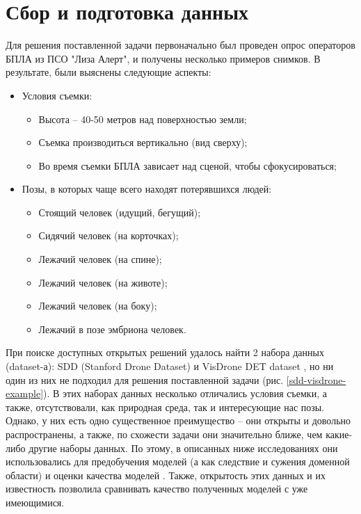 \section{Сбор и подготовка данных}\label{sect-3}

Для решения поставленной задачи первоначально был проведен опрос операторов БПЛА из ПСО "Лиза Алерт", и получены несколько примеров снимков. В результате, были выяснены следующие аспекты:

\begin{itemize}
    \item Условия съемки:
    \begin{itemize}
        \item Высота -- 40-50 метров над поверхностью земли;
        \item Съемка производиться вертикально (вид сверху);
        \item Во время съемки БПЛА зависает над сценой, чтобы сфокусироваться;
    \end{itemize}
    \item Позы, в которых чаще всего находят потерявшихся людей:
    \begin{itemize}
        \item Стоящий человек (идущий, бегущий);
        \item Сидячий человек (на корточках);
        \item Лежачий человек (на спине);
        \item Лежачий человек (на животе);
        \item Лежачий человек (на боку);
        \item Лежачий в позе эмбриона человек.
    \end{itemize}
\end{itemize}

При поиске доступных открытых решений удалось найти 2 набора данных (dataset-а): SDD (Stanford Drone Dataset) \cite{lib-sdd} и VisDrone DET dataset \cite{lib-visdrone}, но ни один из них не подходил для решения поставленной задачи (рис. \ref{sdd-visdrone-example}). В этих наборах данных несколько отличались условия съемки, а также, отсутствовали, как природная среда, так и интересующие нас позы. Однако, у них есть одно существенное преимущество -- они открыты и довольно распространены, а также, по схожести задачи они значительно ближе, чем какие-либо другие наборы данных. По этому, в описанных ниже исследованиях они использовались для предобучения моделей (а как следствие и сужения доменной области) и оценки качества моделей \cite{lib-transfer-learning}. Также, открытость этих данных и их известность позволила сравнивать качество полученных моделей с уже имеющимися.

